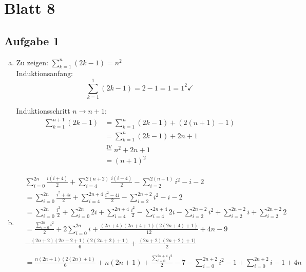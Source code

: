 \section*{Blatt 8}
%

\subsection*{Aufgabe 1}
\begin{enumerate}[a)]
\item Zu zeigen: $  \sum_{k=1}^n (2k-1) = n^2 $\\[1em]
Induktionsanfang: \[ \sum_{k=1}^1 (2k-1) = 2-1 = 1 = 1^2 \checkmark \]


Induktionsschritt $n \to n+1$:
\begin{align*}
\sum_{k=1}^{n+1} (2k-1) &= \sum_{k=1}^n (2k-1) + (2(n+1) -1) \\
                        &= \sum_{k=1}^n (2k-1) + 2 n +1 \\
                        &\stackrel{\text{IV}}{=} n^2 + 2n + 1\\
                        &= (n+1)^2
\end{align*}


\item
%


\begin{align*}
   &\sum_{i=0}^{2n} \frac{i(i+4)}{2}
    + \sum_{i=4}^{2(n+2)} \frac{i(i-4)}{2}
    - \sum_{i=2}^{2(n+1)} i^2 - i - 2 \\
   &=\sum_{i=0}^{2n} \frac{i^2+4i}{2}
    + \sum_{i=4}^{2n +4} \frac{i^2 - 4i}{2}
    - \sum_{i=2}^{2n+2} i^2 - i - 2 \\
   &=\sum_{i=0}^{2n} \frac{i^2}{2} + \sum_{i=0}^{2n} 2i
    + \sum_{i=4}^{2n +4} \frac{i^2}{2} - \sum_{i=4}^{2n +4} 2i
    - \sum_{i=2}^{2n+2} i^2 + \sum_{i=2}^{2n+2} i + \sum_{i=2}^{2n+2} 2 \\
   &=\frac{\sum_{i=0}^{2n}i^2}{2} + 2\sum_{i=0}^{2n}i
    + \frac{(2n+4)(2n+4+1)(2(2n+4)+1)}{12} + 4n - 9 \\
    &- \frac{(2n+2)(2n+2+1)(2(2n+2)+1)}{6} + \frac{(2n+2)(2n+2)+1)}{2} \\
    \\
   &=\frac{n(2n+1)(2(2n)+1)}{6} + n(2n+1)
    + \frac{\sum_{i=0}^{2n +4}i^2}{2} - 7
    - \sum_{i=0}^{2n + 2} i^2 - 1 + \sum_{i=0}^{2n + 2} i - 1 + 4n \\
\end{align*}

\end{enumerate}

